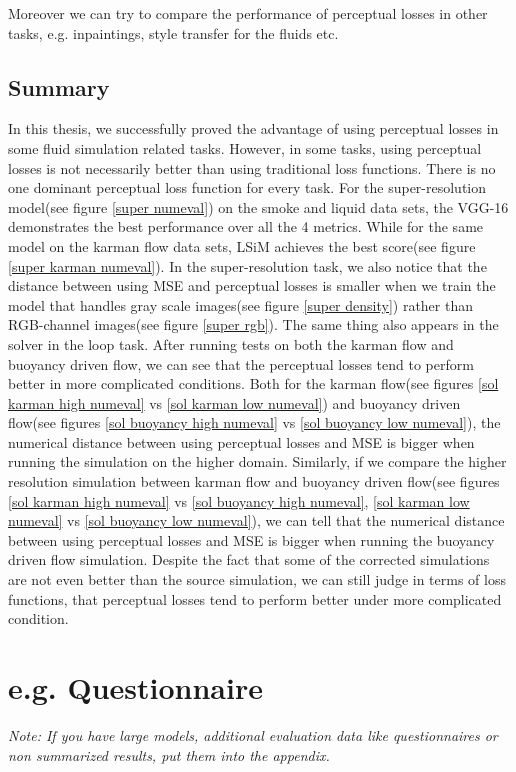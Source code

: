 \documentclass[a4paper,12pt,twoside]{report}
\begin{document}
Moreover we can try to compare the performance of perceptual losses in other tasks, e.g. inpaintings, style transfer for the fluids etc.
\section{Summary}
In this thesis, we successfully proved the advantage of using perceptual losses in some fluid simulation related tasks. However, in some tasks, using perceptual losses is not necessarily better than using traditional loss functions. There is no one dominant perceptual loss function for every task. For the super-resolution model(see figure \ref{super numeval}) on the smoke and liquid data sets, the VGG-16 demonstrates the best performance over all the 4 metrics. While for the same model on the karman flow data sets, LSiM achieves the best score(see figure \ref{super karman numeval}). 
In the super-resolution task, we also notice that the distance between using MSE and perceptual losses is smaller when we train the model that handles gray scale images(see figure \ref{super density}) rather than RGB-channel images(see figure \ref{super rgb}). The same thing also appears in the solver in the loop task. After running tests on both the karman flow and buoyancy driven flow, we can see that the perceptual losses tend to perform better in more complicated conditions. Both for the karman flow(see figures \ref{sol karman high numeval} vs \ref{sol karman low numeval}) and buoyancy driven flow(see figures \ref{sol buoyancy high numeval} vs \ref{sol buoyancy low numeval}), the numerical distance between using perceptual losses and MSE is bigger when running the simulation on the higher domain. Similarly, if we compare the higher resolution simulation between karman flow and buoyancy driven flow(see figures \ref{sol karman high numeval} vs \ref{sol buoyancy high numeval}, \ref{sol karman low numeval} vs \ref{sol buoyancy low numeval}), we can tell that the numerical distance between using perceptual losses and MSE is bigger when running the buoyancy driven flow simulation. Despite the fact that some of the corrected simulations are not even better than the source simulation, we can still judge in terms of loss functions, that perceptual losses tend to perform better under more complicated condition. 






\appendix

\chapter{e.g. Questionnaire}

\textit{Note: If you have large models, additional evaluation data like questionnaires or non summarized results, put them into the appendix.}


\clearpage

\clearpage

\listoftables
\clearpage


%

\end{document}
